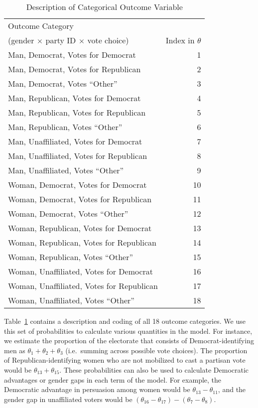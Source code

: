 \documentclass[12pt
               ,final
               ]{article}
\begin{document}
\begin{table}[hbt]
  \begin{center}
  \caption{Description of Categorical Outcome Variable}
  \label{tab:y-table}
  \begin{tabular}{l r}

    \toprule

    Outcome Category &   \\ 
    (gender $\times$ party ID $\times$ vote choice) & Index in $\theta$ \\
    \midrule
    
    Man, Democrat, Votes for Democrat & 1 \\ 
    Man, Democrat, Votes for Republican & 2 \\ 
    Man, Democrat, Votes ``Other'' & 3 \\ 
    Man, Republican, Votes for Democrat & 4 \\ 
    Man, Republican, Votes for Republican & 5 \\ 
    Man, Republican, Votes ``Other'' & 6 \\ 
    Man, Unaffiliated, Votes for Democrat & 7 \\ 
    Man, Unaffiliated, Votes for Republican & 8 \\ 
    Man, Unaffiliated, Votes ``Other'' & 9 \\ 
    Woman, Democrat, Votes for Democrat & 10 \\ 
    Woman, Democrat, Votes for Republican & 11 \\ 
    Woman, Democrat, Votes ``Other'' & 12 \\ 
    Woman, Republican, Votes for Democrat & 13 \\ 
    Woman, Republican, Votes for Republican & 14 \\ 
    Woman, Republican, Votes ``Other'' & 15 \\ 
    Woman, Unaffiliated, Votes for Democrat & 16 \\ 
    Woman, Unaffiliated, Votes for Republican & 17 \\ 
    Woman, Unaffiliated, Votes ``Other'' & 18 \\ 

    \bottomrule

  \end{tabular}
  \end{center}
\end{table}

Table~\ref{tab:y-table} contains a description and coding of all 18 outcome categories. We use this set of probabilities to calculate various quantities in the model. For instance, we estimate the proportion of the electorate that consists of Democrat-identifying men as $\theta_{1} + \theta_{2} + \theta_{3}$ (i.e.\ summing across possible vote choices). The proportion of Republican-identifying women who are not mobilized to cast a partisan vote would be $\theta_{13} + \theta_{15}$. These probabilities can also be used to calculate Democratic advantages or gender gaps in each term of the model. For example, the Democratic advantage in persuasion among women would be $\theta_{13} - \theta_{11}$, and the gender gap in unaffiliated voters would be $(\theta_{16} - \theta_{17}) - (\theta_{7} - \theta_{8})$.
\end{document}
